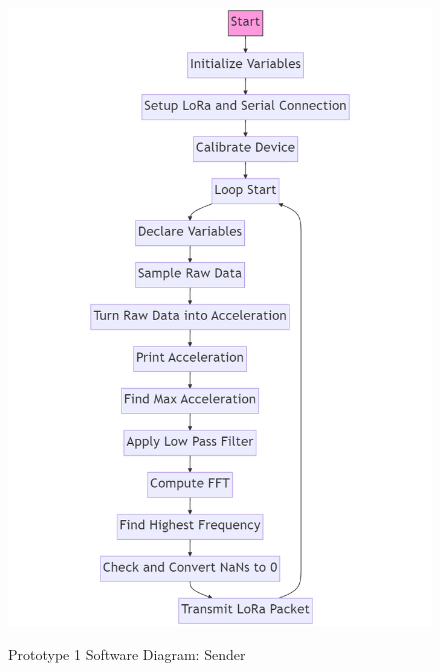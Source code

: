 \begin{figure}[H]
	\centering
	\caption{Prototype 1 Software Diagram: Sender}
	\includegraphics[width=\textwidth]{Sections/Design-Process/proto1-soft-diagram-n.png}
	\label{proto1-soft-diagram}
\end{figure}

